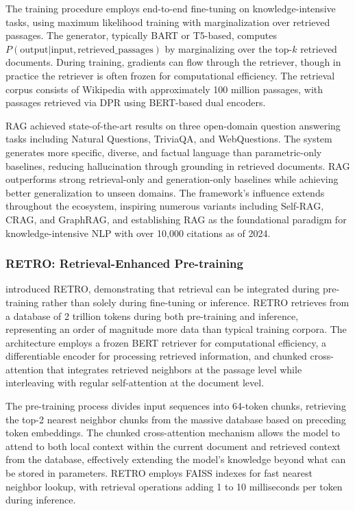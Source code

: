 \documentclass[11pt,letterpaper]{article}
\begin{document}
The training procedure employs end-to-end fine-tuning on knowledge-intensive tasks, using maximum likelihood training with marginalization over retrieved passages. The generator, typically BART or T5-based, computes $P(\text{output} | \text{input}, \text{retrieved\_passages})$ by marginalizing over the top-$k$ retrieved documents. During training, gradients can flow through the retriever, though in practice the retriever is often frozen for computational efficiency. The retrieval corpus consists of Wikipedia with approximately 100 million passages, with passages retrieved via DPR using BERT-based dual encoders.

RAG achieved state-of-the-art results on three open-domain question answering tasks including Natural Questions, TriviaQA, and WebQuestions. The system generates more specific, diverse, and factual language than parametric-only baselines, reducing hallucination through grounding in retrieved documents. RAG outperforms strong retrieval-only and generation-only baselines while achieving better generalization to unseen domains. The framework's influence extends throughout the ecosystem, inspiring numerous variants including Self-RAG, CRAG, and GraphRAG, and establishing RAG as the foundational paradigm for knowledge-intensive NLP with over 10,000 citations as of 2024.

\subsubsection{RETRO: Retrieval-Enhanced Pre-training}

\cite{borgeaud2022improving} introduced RETRO, demonstrating that retrieval can be integrated during pre-training rather than solely during fine-tuning or inference. RETRO retrieves from a database of 2 trillion tokens during both pre-training and inference, representing an order of magnitude more data than typical training corpora. The architecture employs a frozen BERT retriever for computational efficiency, a differentiable encoder for processing retrieved information, and chunked cross-attention that integrates retrieved neighbors at the passage level while interleaving with regular self-attention at the document level.

The pre-training process divides input sequences into 64-token chunks, retrieving the top-2 nearest neighbor chunks from the massive database based on preceding token embeddings. The chunked cross-attention mechanism allows the model to attend to both local context within the current document and retrieved context from the database, effectively extending the model's knowledge beyond what can be stored in parameters. RETRO employs FAISS indexes for fast nearest neighbor lookup, with retrieval operations adding 1 to 10 milliseconds per token during inference.
\end{document}
